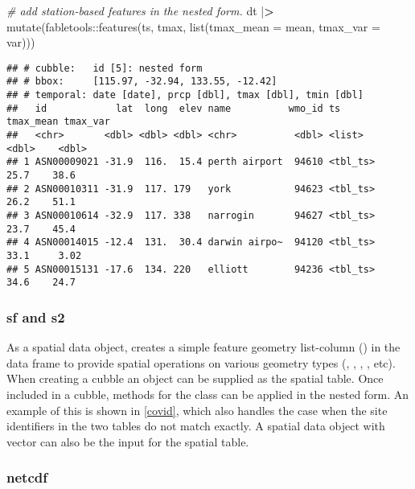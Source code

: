 \documentclass{article}
\newenvironment{Shaded}{\begin{snugshade}}{\end{snugshade}}
\newcommand{\AttributeTok}[1]{\textcolor[rgb]{0.77,0.63,0.00}{#1}}
\newcommand{\CommentTok}[1]{\textcolor[rgb]{0.56,0.35,0.01}{\textit{#1}}}
\newcommand{\ErrorTok}[1]{\textcolor[rgb]{0.64,0.00,0.00}{\textbf{#1}}}
\newcommand{\FunctionTok}[1]{\textcolor[rgb]{0.00,0.00,0.00}{#1}}
\newcommand{\NormalTok}[1]{#1}
\newcommand{\SpecialCharTok}[1]{\textcolor[rgb]{0.00,0.00,0.00}{#1}}
\begin{document}
\begin{Shaded}
\begin{Highlighting}[]
\CommentTok{\# add station{-}based features in the nested form.}
\NormalTok{dt }\SpecialCharTok{|}\ErrorTok{\textgreater{}} \FunctionTok{mutate}\NormalTok{(fabletools}\SpecialCharTok{::}\FunctionTok{features}\NormalTok{(ts, tmax, }\FunctionTok{list}\NormalTok{(}\AttributeTok{tmax\_mean =}\NormalTok{ mean, }\AttributeTok{tmax\_var =}\NormalTok{ var)))}
\end{Highlighting}
\end{Shaded}

\begin{verbatim}
## # cubble:   id [5]: nested form
## # bbox:     [115.97, -32.94, 133.55, -12.42]
## # temporal: date [date], prcp [dbl], tmax [dbl], tmin [dbl]
##   id            lat  long  elev name          wmo_id ts       tmax_mean tmax_var
##   <chr>       <dbl> <dbl> <dbl> <chr>          <dbl> <list>       <dbl>    <dbl>
## 1 ASN00009021 -31.9  116.  15.4 perth airport  94610 <tbl_ts>      25.7    38.6 
## 2 ASN00010311 -31.9  117. 179   york           94623 <tbl_ts>      26.2    51.1 
## 3 ASN00010614 -32.9  117. 338   narrogin       94627 <tbl_ts>      23.7    45.4 
## 4 ASN00014015 -12.4  131.  30.4 darwin airpo~  94120 <tbl_ts>      33.1     3.02
## 5 ASN00015131 -17.6  134. 220   elliott        94236 <tbl_ts>      34.6    24.7
\end{verbatim}

\hypertarget{sf-and-s2}{%
\subsubsection{sf and s2}\label{sf-and-s2}}

As a spatial data object,  creates a simple feature geometry list-column () in the data frame to provide spatial operations on various geometry types (, , , , etc). When creating a cubble an  object can be supplied as the spatial table. Once included in a cubble, methods for the  class can be applied in the nested form. An example of this is shown in \ref{covid}, which also handles the case when the site identifiers in the two tables do not match exactly. A spatial data object with  vector can also be the input for the spatial table.

\hypertarget{netcdf}{%
\subsubsection{netcdf}\label{netcdf}}
\end{document}
